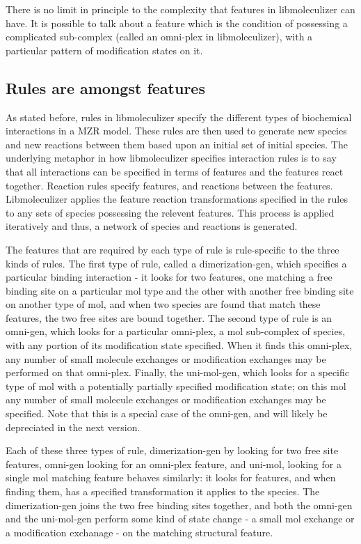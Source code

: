 There is no limit in principle to the complexity that features in
libmoleculizer can have. It is possible to talk about a feature which
is the condition of possessing a complicated sub-complex (called an
omni-plex in libmoleculizer), with a particular pattern of
modification states on it.  

\subsection{Rules are amongst features}
As stated before, rules in libmoleculizer specify the different types
of biochemical interactions in a MZR model.  These rules are then used
to generate new species and new reactions between them based upon an
initial set of initial species. The underlying metaphor in how
libmoleculizer specifies interaction rules is to say that all
interactions can be specified in terms of features and the features
react together.  Reaction rules specify features, and reactions
between the features.  Libmoleculizer applies the feature reaction
transformations specified in the rules to any sets of species
possessing the relevent features.  This process is applied
iteratively and thus, a network of species and reactions is generated.  

The features that are required by each type of rule is rule-specific
to the three kinds of rules.  The first type of rule, called a
dimerization-gen, which specifies a particular binding interaction -
it looks for two features, one matching a free binding site on a
particular mol type and the other with another free binding site on
another type of mol, and when two species are found that match these
features, the two free sites are bound together.  The second type of
rule is an omni-gen, which looks for a particular omni-plex, a mol
sub-complex of species, with any portion of its modification state
specified.  When it finds this omni-plex, any number of small molecule
exchanges or modification exchanges may be performed on that
omni-plex.  Finally, the uni-mol-gen, which looks for a specific type
of mol with a potentially partially specified modification state; on
this mol any number of small molecule exchanges or modification
exchanges may be specified.  Note that this is a special case of the
omni-gen, and will likely be depreciated in the next version.

Each of these three types of rule, dimerization-gen by looking for two
free site features, omni-gen looking for an omni-plex feature, and
uni-mol, looking for a single mol matching feature behaves similarly:
it looks for features, and when finding them, has a specified
transformation it applies to the species.  The dimerization-gen joins
the two free binding sites together, and both the omni-gen and the
uni-mol-gen perform some kind of state change - a small mol exchange
or a modification exchanage - on the matching structural feature.

